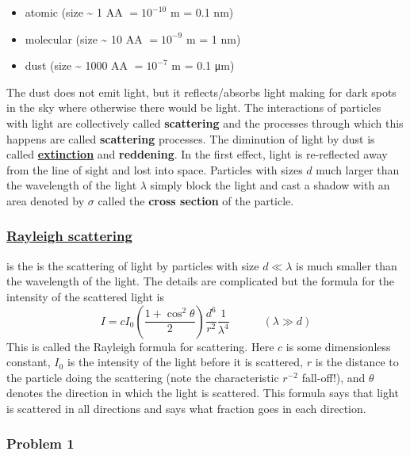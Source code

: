 \documentclass[11pt]{article}
\providecommand{\tightlist}{%
      \setlength{\itemsep}{0pt}\setlength{\parskip}{0pt}}
\begin{document}
\begin{itemize}
\tightlist
\item
  atomic (size \textasciitilde{} 1 AA \(=10^{-10}\) m = 0.1 nm)\\
\item
  molecular (size \textasciitilde{} 10 AA \(=10^{-9}\) m = 1 nm)\\
\item
  dust (size \textasciitilde{} 1000 AA \(=10^{-7}\) m = 0.1 μm)
\end{itemize}

The dust does not emit light, but it reflects/absorbs light making for
dark spots in the sky where otherwise there would be light. The
interactions of particles with light are collectively called
\textbf{scattering} and the processes through which this happens are
called \textbf{scattering} processes. The diminution of light by dust is
called
\href{https://en.wikipedia.org/wiki/Extinction_(astronomy)}{\textbf{extinction}}
and \textbf{reddening}. In the first effect, light is re-reflected away
from the line of sight and lost into space. Particles with sizes \(d\)
much larger than the wavelength of the light \(\lambda\) simply block
the light and cast a shadow with an area denoted by \(\sigma\) called
the \textbf{cross section} of the particle.

\subsubsection{\texorpdfstring{\href{https://en.wikipedia.org/wiki/Rayleigh_scattering}{Rayleigh
scattering}}{Rayleigh scattering}}\label{rayleigh-scattering}

is the is the scattering of light by particles with size
\(d\ll \lambda\) is much smaller than the wavelength of the light. The
details are complicated but the formula for the intensity of the
scattered light is \[
    I = c I_0 \left(\frac{1+\cos^2\theta}2\right) \frac {d^6}{r^2}\frac1{\lambda^4} \quad \quad \quad(\lambda \gg d)    \tag{1}
\] This is called the Rayleigh formula for scattering. Here \(c\) is
some dimensionless constant, \(I_0\) is the intensity of the light
before it is scattered, \(r\) is the distance to the particle doing the
scattering (note the characteristic \(r^{-2}\) fall-off!), and
\(\theta\) denotes the direction in which the light is scattered. This
formula says that light is scattered in all directions and says what
fraction goes in each direction.

 
\subsubsection{Problem 1}\label{problem-1}
\end{document}
